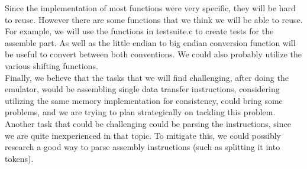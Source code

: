\documentclass[11pt]{article}
\begin{document}
Since the implementation of most functions were very specific, they will be hard to reuse. However there are some functions that we think we will be able to reuse. For example, we will use the functions in testsuite.c to create tests for the assemble part. As well as the little endian to big endian conversion function will be useful to convert between both conventions. We could also probably utilize the various shifting functions. \\

Finally, we believe that the tasks that we will find challenging, after doing the emulator, would be assembling single data transfer instructions, considering utilizing the same memory implementation for consistency, could bring some problems, and we are trying to plan strategically on tackling this problem. Another task that could be challenging could be parsing the instructions, since we are quite inexperienced in that topic. To mitigate this, we could possibly research a good way to parse assembly instructions (such as splitting it into tokens).
\end{document}
